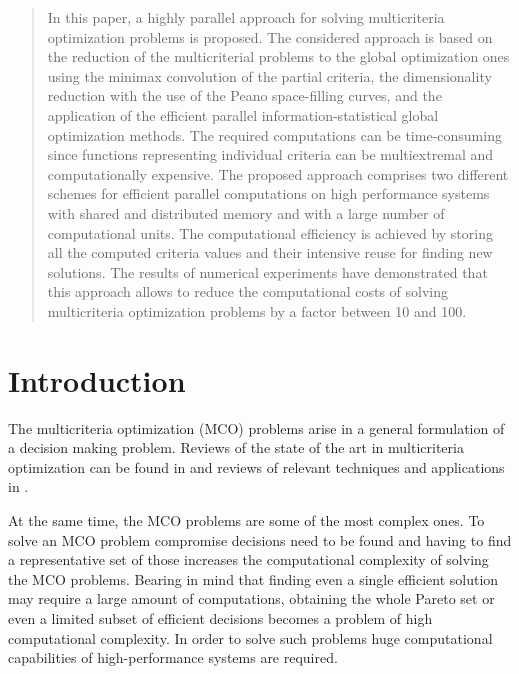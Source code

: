 \maketitle

\begin{abstract}
In this paper, a highly parallel approach for solving multicriteria optimization problems is proposed. The considered approach is based on the reduction of the multicriterial problems to the global optimization ones using the minimax convolution of the partial criteria, the dimensionality reduction with the use of the Peano space-filling curves, and the application of the efficient parallel information-statistical global optimization methods. The required computations can be time-consuming since functions representing individual criteria can be multiextremal and computationally expensive. The proposed approach comprises two different schemes for efficient parallel computations on high performance systems with shared and distributed memory and with a large number of computational units. The computational efficiency is achieved by storing all the computed criteria values and their intensive reuse for finding new solutions. The results of numerical experiments have demonstrated that this approach allows to reduce the computational costs of solving multicriteria optimization problems by a factor between 10 and 100. 
\end{abstract}

\section{Introduction}
\label{sec:1}

The multicriteria optimization (MCO) problems arise in a general formulation of a decision making problem. Reviews of the state of the art in multicriteria optimization can be found in \cite{c1,c2,c3,c12} and reviews of relevant techniques and applications in \cite{c4,c5,c6,c7,c13,c50}.

At the same time, the MCO problems are some of the most complex ones. To solve an MCO problem compromise decisions need to be found and having to find a representative set of those increases the computational complexity of solving the MCO problems. Bearing in mind that finding even a single efficient solution may require a large amount of computations, obtaining the whole Pareto set or even a limited subset of efficient decisions becomes a problem of high computational complexity. In order to solve such problems huge computational capabilities of high-performance systems are required. 

